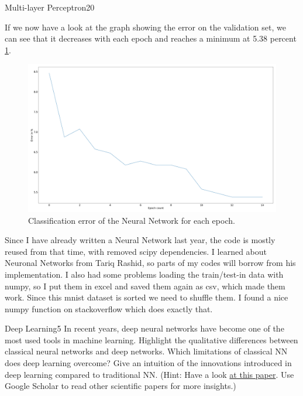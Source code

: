 \begin{questions}
\begin{question}{Multi-layer Perceptron}{20}
\begin{answer}
If we now have a look at the graph showing the error on the validation set, we can see that it decreases with each epoch and reaches a minimum at 5.38 percent \ref{fig:nn}. 
\end{answer}
\begin{figure}[H]
	\includegraphics[width=0.8\linewidth]{pictures/NN_loss.png}
	\centering
	\caption{Classification error of the Neural Network for each epoch.}
	\label{fig:nn}
\end{figure}

Since I have already written a Neural Network last year, the code is mostly reused from that time, with removed scipy dependencies. I learned about Neuronal Networks from Tariq Rashid, so parts of my codes will borrow from his implementation. I also had some problems loading the train/test-in data with numpy, so I put them in excel and saved them again as csv, which made them work. Since this mnist dataset is sorted we need to shuffle them. I found a nice numpy function on stackoverflow which does exactly that. 

\end{question}


\begin{question}[bonus]{Deep Learning}{5}
In recent years, deep neural networks have become one of the most used tools in machine learning. 
Highlight the qualitative differences between classical neural networks and deep networks. Which limitations of classical NN does deep learning overcome?
Give an intuition of the innovations introduced in deep learning compared to traditional NN.
(Hint: Have a look \href{http://arxiv.org/abs/1206.5538}{at this paper}. Use Google Scholar to read other scientific papers for more insights.)

\begin{answer}\end{answer}

\end{question}


\end{questions}
